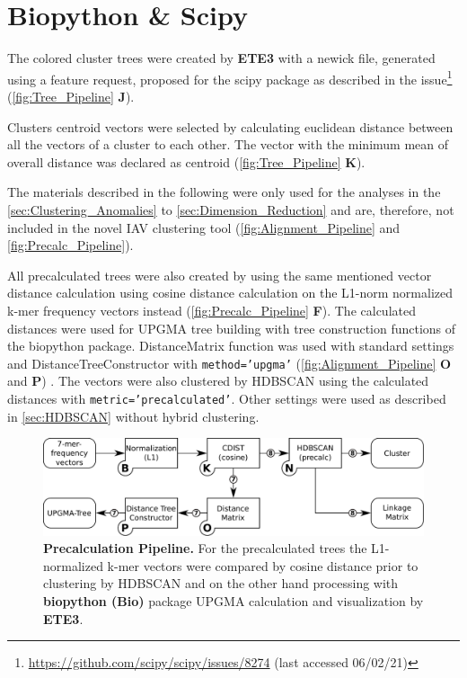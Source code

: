 \section{Biopython \& Scipy} \label{sec:MAFFT}

The colored cluster trees were created by \textbf{ETE3} with a newick file, generated using a feature request, proposed for the scipy package as described in the issue\footnote{\url{https://github.com/scipy/scipy/issues/8274} (last accessed 06/02/21)} (\autoref{fig:Tree_Pipeline} \textsf{\textbf{J}}).

Clusters centroid vectors were selected by calculating euclidean distance between all the vectors of a cluster to each other. The vector with the minimum mean of overall distance was declared as centroid (\autoref{fig:Tree_Pipeline} \textsf{\textbf{K}}). 

The materials described in the following were only used for the analyses in the \autoref{sec:Clustering_Anomalies} to \autoref{sec:Dimension_Reduction} and are, therefore, not included in the novel \gls{IAV} clustering tool (\autoref{fig:Alignment_Pipeline} and \autoref{fig:Precalc_Pipeline}).

All precalculated trees were also created by using the same mentioned vector distance calculation using cosine distance calculation on the L1-norm normalized k-mer frequency vectors instead (\autoref{fig:Precalc_Pipeline} \textsf{\textbf{F}}). The calculated distances were used for \gls{UPGMA} tree building with tree construction functions of the biopython package. DistanceMatrix function was used with standard settings and DistanceTreeConstructor with \texttt{method='upgma'} (\autoref{fig:Alignment_Pipeline} \textsf{\textbf{O}} and \textsf{\textbf{P}}) \autocite{gower_minimum_1969}. The vectors were also clustered by \gls{HDBSCAN} using the calculated distances with \texttt{metric='precalculated'}. Other settings were used as described in \autoref{sec:HDBSCAN} without hybrid clustering.

\begin{figure}[!hbt]
    \centering
    \includegraphics[width=\textwidth]{Graphics/Precalculated.pdf}
    \caption[Precalculation Pipeline]{\textbf{Precalculation Pipeline.} For the precalculated trees the L1-normalized k-mer vectors were compared by cosine distance prior to clustering by \gls{HDBSCAN} and on the other hand processing with \textbf{biopython (Bio)} package \gls{UPGMA} calculation and visualization by \textbf{ETE3}.}
    \label{fig:Precalc_Pipeline}
\end{figure}

